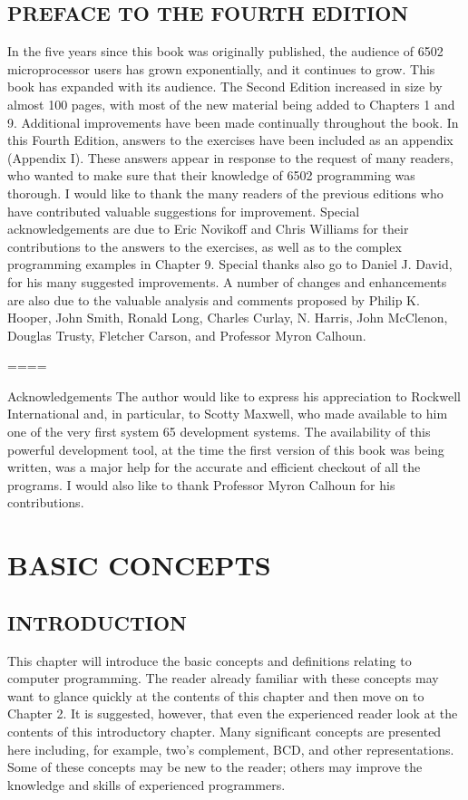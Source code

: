\section*{PREFACE TO THE FOURTH EDITION}

In the five years since this book was originally published, the audience of 6502 microprocessor users has grown exponentially, and it continues
to grow. This book has expanded with its audience.
The Second Edition increased in size by almost 100 pages, with most of the new material being added to Chapters 1 and 9. Additional improvements have been made continually throughout the book. In this Fourth Edition, answers to the exercises have been included as an appendix (Appendix I). These answers appear in response to the request of many readers, who wanted to make sure that their knowledge of 6502 programming was thorough.
I would like to thank the many readers of the previous editions who have contributed valuable suggestions for improvement. Special acknowledgements are due to Eric Novikoff and Chris Williams for their contributions to the answers to the exercises, as well as to the complex programming examples in Chapter 9. Special thanks also go to Daniel J. David, for his many suggested improvements. A number of changes and enhancements are also due to the valuable analysis and comments proposed by Philip K. Hooper, John Smith, Ronald Long, Charles Curlay, N. Harris, John McClenon, Douglas Trusty, Fletcher Carson, and Professor Myron Calhoun.

====

Acknowledgements
The author would like to express his appreciation to Rockwell International and, in particular, to Scotty Maxwell, who made available to him one of the very first system 65 development systems. The availability of this powerful development tool, at the time the first version of this book was being written, was a major help for the accurate and efficient checkout of all the programs. I would also like to thank Professor Myron Calhoun for his contributions.


\chapter{BASIC CONCEPTS}

\section*{INTRODUCTION}

This chapter will introduce the basic concepts and definitions relating to computer programming. The reader already familiar with these concepts may want to glance quickly at the contents of this chapter and then move on to Chapter 2. It is suggested, however, that even the experienced reader look at the contents of this introductory chapter. Many significant concepts are presented here including, for example, two's complement, BCD, and other representations. Some of these concepts may be new to the reader; others may improve the knowledge and skills of experienced programmers.

